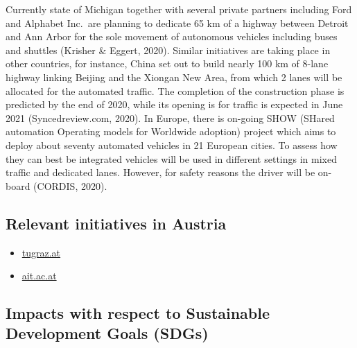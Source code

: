 \documentclass[
]{book}
\providecommand{\tightlist}{%
  \setlength{\itemsep}{0pt}\setlength{\parskip}{0pt}}
\begin{document}
Currently state of Michigan together with several private partners including Ford and Alphabet Inc.~are planning to dedicate 65 km of a highway between Detroit and Ann Arbor for the sole movement of autonomous vehicles including buses and shuttles (Krisher \& Eggert, 2020). Similar initiatives are taking place in other countries, for instance, China set out to build nearly 100 km of 8-lane highway linking Beijing and the Xiongan New Area, from which 2 lanes will be allocated for the automated traffic. The completion of the construction phase is predicted by the end of 2020, while its opening is for traffic is expected in June 2021 (Syncedreview.com, 2020). In Europe, there is on-going SHOW (SHared automation Operating models for Worldwide adoption) project which aims to deploy about seventy automated vehicles in 21 European cities. To assess how they can best be integrated vehicles will be used in different settings in mixed traffic and dedicated lanes. However, for safety reasons the driver will be on-board (CORDIS, 2020).

\hypertarget{relevant-initiatives-in-austria}{%
\subsection*{Relevant initiatives in Austria}\label{relevant-initiatives-in-austria}}

\begin{itemize}
\tightlist
\item
  \href{https://www.tugraz.at/fileadmin/user_upload/Institute/IHF/Projekte/ENABLE-S3_SummaryofResults_May2019.pdf}{tugraz.at}
\item
  \href{https://www.ait.ac.at/themen/verkehrssicherheit-und-unfallforschung/projects/via-autonom/}{ait.ac.at}
\end{itemize}

\hypertarget{impacts-with-respect-to-sustainable-development-goals-sdgs}{%
\subsection*{Impacts with respect to Sustainable Development Goals (SDGs)}\label{impacts-with-respect-to-sustainable-development-goals-sdgs}}
\end{document}

